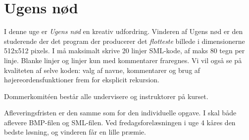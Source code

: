 \documentclass[a4paper,12pt]{article}
\begin{document}
\section{Ugens nød}
\label{sec:ugens-nod}
I denne uge er \textit{Ugens nød} en kreativ udfordring. Vinderen af
Ugens nød er den studerende der det program der producerer det
\textit{flotteste} billede i dimensionerne 512x512 pixels. I må
maksimalt skrive 20 linjer SML-kode, af maks 80 tegn per linje. Blanke
linjer og linjer kun med kommentarer fraregnes. Vi vil også se på
kvaliteten af selve koden: valg af navne, kommentarer og brug af
højereordensfunktioner frem for eksplicit rekursion.

Dommerkomitéen består alle undervisere og instruktorer på kurset.

Afleveringsfristen er den samme som for den individuelle opgave. I
skal både aflevere BMP-filen og SML-filen. Ved fredagsforelæsningen i
uge 4 kåres den bedste løsning, og vinderen får en lille præmie.
\end{document}
